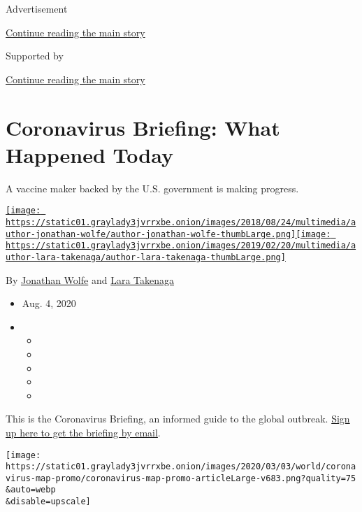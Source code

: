 Advertisement

\protect\hyperlink{after-top}{Continue reading the main story}

Supported by

\protect\hyperlink{after-sponsor}{Continue reading the main story}

\hypertarget{coronavirus-briefing-what-happened-today}{%
\section{Coronavirus Briefing: What Happened
Today}\label{coronavirus-briefing-what-happened-today}}

A vaccine maker backed by the U.S. government is making progress.

\href{https://www.nytimes3xbfgragh.onion/by/jonathan-wolfe}{\texttt{[image: https://static01.graylady3jvrrxbe.onion/images/2018/08/24/multimedia/author-jonathan-wolfe/author-jonathan-wolfe-thumbLarge.png]}}\href{https://www.nytimes3xbfgragh.onion/by/lara-takenaga}{\texttt{[image: https://static01.graylady3jvrrxbe.onion/images/2019/02/20/multimedia/author-lara-takenaga/author-lara-takenaga-thumbLarge.png]}}

By \href{https://www.nytimes3xbfgragh.onion/by/jonathan-wolfe}{Jonathan
Wolfe} and
\href{https://www.nytimes3xbfgragh.onion/by/lara-takenaga}{Lara
Takenaga}

\begin{itemize}
\item
  Aug. 4, 2020
\item
  \begin{itemize}
  \item
  \item
  \item
  \item
  \item
  \end{itemize}
\end{itemize}

This is the Coronavirus Briefing, an informed guide to the global
outbreak.
\href{https://www.nytimes3xbfgragh.onion/newsletters/coronavirus-briefing}{Sign
up here to get the briefing by email}.

\texttt{[image: https://static01.graylady3jvrrxbe.onion/images/2020/03/03/world/coronavirus-map-promo/coronavirus-map-promo-articleLarge-v683.png?quality=75\\\&auto=webp\\\&disable=upscale]}

